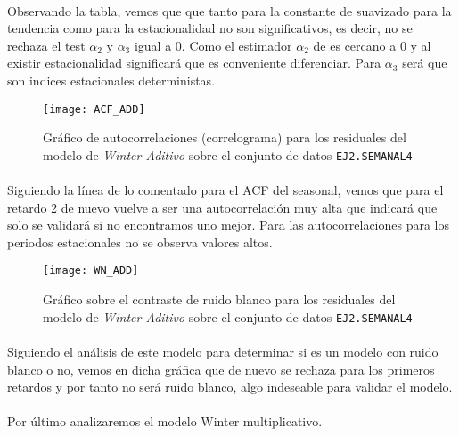 \documentclass[a4paper, spanish]{article}
\begin{document}
      \paragraph{}
      Observando la tabla, vemos que que tanto para la constante de suavizado para la tendencia como para la estacionalidad no son significativos, es decir, no se rechaza el test $\alpha_2$ y $\alpha_3$ igual a 0. Como el estimador $\alpha_2$ de es cercano a 0 y al existir estacionalidad significará que es conveniente diferenciar. Para $\alpha_3$ será que son indices estacionales deterministas.

      \begin{figure}[htb!]
        \centering
        \texttt{[image: ACF\_ADD]}
        \caption{Gráfico de autocorrelaciones (correlograma) para los residuales del modelo de \emph{Winter Aditivo} sobre el conjunto de datos \texttt{EJ2.SEMANAL4}}
        \label{img:b_winter_additive_residuals_correlogram}
      \end{figure}

      \paragraph{}
      Siguiendo la línea de lo comentado para el ACF del seasonal, vemos que para el retardo 2 de nuevo vuelve a ser una autocorrelación muy alta que indicará que solo se validará si no encontramos uno mejor. Para las autocorrelaciones para los periodos estacionales no se observa valores altos.

      \begin{figure}[htb!]
        \centering
        \texttt{[image: WN\_ADD]}
        \caption{Gráfico sobre el contraste de ruido blanco para los residuales del modelo de \emph{Winter Aditivo} sobre el conjunto de datos \texttt{EJ2.SEMANAL4}}
        \label{img:b_winter_additive_test_white_noise}
      \end{figure}

      \paragraph{}
      Siguiendo el análisis de este modelo para determinar si es un modelo con ruido blanco o no, vemos en dicha gráfica que de nuevo se rechaza para los primeros retardos y por tanto no será ruido blanco, algo indeseable para validar el modelo.

      \paragraph{}
      Por último analizaremos el modelo Winter multiplicativo.
\end{document}
